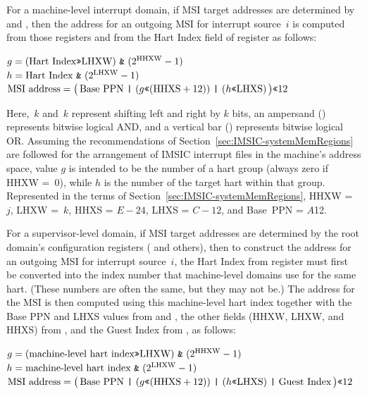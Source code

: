 For a machine-level interrupt domain, if MSI target addresses are
determined by  and , then the address
for an outgoing MSI for interrupt source~$i$ is computed from those
registers and from the Hart Index field of register  as
follows:
\begin{displayLinesTable}
$g =
  (\mbox{Hart Index\z{>>}LHXW})\mbox{ \z{\&} }(\mbox{2}^{\rm HHXW}-\mbox{1})$\\
$h = \mbox{Hart Index \z{\&} }(\mbox{2}^{\rm LHXW}-\mbox{1})$\\
$\mbox{MSI address} =
  \bigl(\,
    \mbox{Base PPN \z{|} }(g\mbox{\z{<<}}(\mbox{HHXS}+\mbox{12}))
      \mbox{ \z{|} }(h\mbox{\z{<<}LHXS})
  \,\bigr)\mbox{\z{<<}12}$
\end{displayLinesTable}
Here, \z{<<}$\,k$ and \z{>>}$\,k$ represent shifting left and right by
$k$ bits, an ampersand (\z{\&}) represents bitwise logical AND, and a
vertical bar (\z{|}) represents bitwise logical OR.
Assuming the recommendations of
Section~\ref{sec:IMSIC-systemMemRegions} are followed for the
arrangement of IMSIC interrupt files in the machine's address space,
value $g$ is intended to be the number of a hart group (always zero
if HHXW =~0), while $h$ is the number of the target hart within that
group.
Represented in the terms of Section~\ref{sec:IMSIC-systemMemRegions},
HHXW =~$j$, LHXW =~$k$, HHXS = ${E-24}$, LHXS = ${C-12}$, and
Base~PPN = $A$\z{>>}12.

For a supervisor-level domain, if MSI target addresses are determined
by the root domain's configuration registers ( and others),
then to construct the address for an outgoing MSI for interrupt
source~$i$, the Hart Index from register  must first be
converted into the index number that machine-level domains use for
the same hart.
(These numbers are often the same, but they may not be.)
The address for the MSI is then computed using this machine-level hart
index together with the Base PPN and LHXS values
from  and ,
the other fields (HHXW, LHXW, and HHXS) from ,
and the Guest Index from , as follows:
\begin{displayLinesTable}
$g =
  (\mbox{machine-level hart index\z{>>}LHXW})
    \mbox{ \z{\&} }(\mbox{2}^{\rm HHXW}-\mbox{1})$\\
$h = \mbox{machine-level hart index \z{\&} }(\mbox{2}^{\rm LHXW}-\mbox{1})$\\
$\mbox{MSI address} =
  \bigl(\,
    \mbox{Base PPN \z{|} }(g\mbox{\z{<<}}(\mbox{HHXS}+\mbox{12}))
      \mbox{ \z{|} }(h\mbox{\z{<<}LHXS})\mbox{ \z{|} Guest Index}
  \,\bigr)\mbox{\z{<<}12}$
\end{displayLinesTable}

